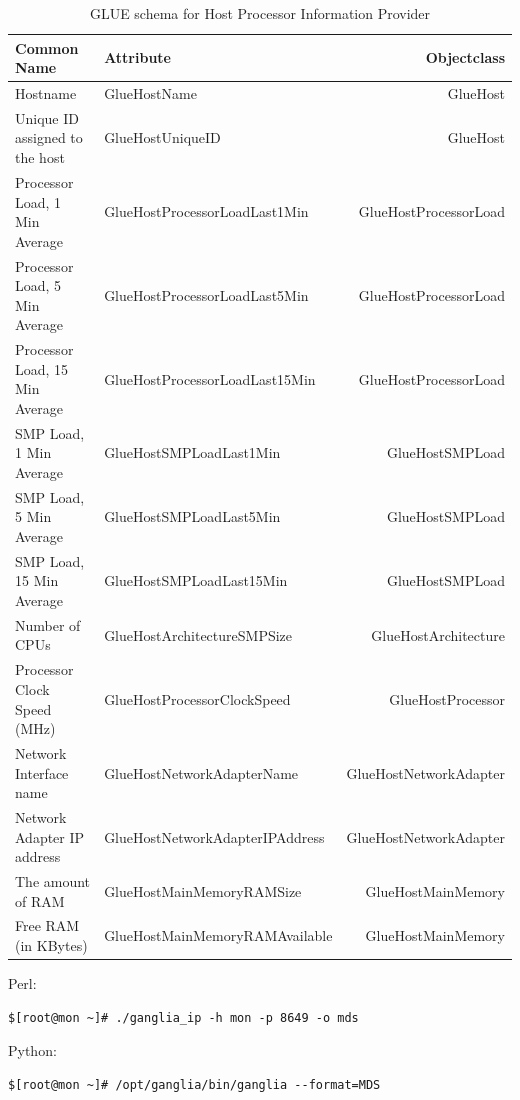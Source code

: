 \begin{table}[ht]
\small\addtolength{\tabcolsep}{-3pt}
\begin{tabular}{ | l | l | r |}
\hline
{\bf Common Name} & {\bf Attribute} & {\bf Objectclass} \\ \hline
Hostname & GlueHostName & GlueHost \\ \hline
Unique ID assigned to the host & GlueHostUniqueID & GlueHost  \\ \hline
Processor Load, 1 Min Average  & GlueHostProcessorLoadLast1Min & GlueHostProcessorLoad \\ \hline
Processor Load, 5 Min Average  & GlueHostProcessorLoadLast5Min & GlueHostProcessorLoad \\ \hline
Processor Load, 15 Min Average  & GlueHostProcessorLoadLast15Min & GlueHostProcessorLoad \\ \hline
SMP Load, 1 Min Average  & GlueHostSMPLoadLast1Min & GlueHostSMPLoad \\ \hline
SMP Load, 5 Min Average  & GlueHostSMPLoadLast5Min & GlueHostSMPLoad \\ \hline
SMP Load, 15 Min Average  & GlueHostSMPLoadLast15Min & GlueHostSMPLoad \\ \hline
Number of CPUs  & GlueHostArchitectureSMPSize & GlueHostArchitecture \\ \hline
Processor Clock Speed (MHz)  & GlueHostProcessorClockSpeed & GlueHostProcessor \\ \hline
Network Interface name  & GlueHostNetworkAdapterName & GlueHostNetworkAdapter \\ \hline
Network Adapter IP address  & GlueHostNetworkAdapterIPAddress & GlueHostNetworkAdapter \\ \hline
The amount of RAM  & GlueHostMainMemoryRAMSize & GlueHostMainMemory \\ \hline
Free RAM (in KBytes)  & GlueHostMainMemoryRAMAvailable & GlueHostMainMemory \\ \hline
\end{tabular}
\caption{GLUE schema for Host Processor Information Provider}
\label{tab:glue}
\end{table}

Perl:
\begin{lstlisting}
$[root@mon ~]# ./ganglia_ip -h mon -p 8649 -o mds
\end{lstlisting}

Python:
\begin{lstlisting}
$[root@mon ~]# /opt/ganglia/bin/ganglia --format=MDS
\end{lstlisting}

